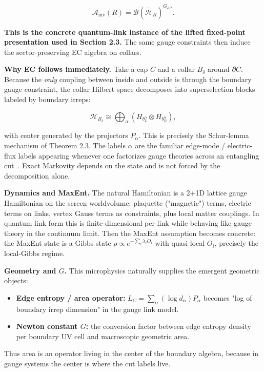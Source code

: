 \[
\mathcal{A}_{\mathrm{inv}}(R) = \mathcal{B}(\tilde{\mathcal{H}}_R)^{G_{\partial R}}.
\]

\textbf{This is the concrete quantum-link instance of the lifted fixed-point presentation used in Section 2.3.} The same gauge constraints then induce the sector-preserving EC algebra on collars.

\textbf{Why EC follows immediately.} Take a cap \(C\) and a collar \(B_\delta\) around \(\partial C\). Because the \emph{only} coupling between inside and outside is through the boundary gauge constraint, the collar Hilbert space decomposes into superselection blocks labeled by boundary irreps:

\[
\mathcal{H}_{B_\delta} \cong \bigoplus_\alpha (H_{b_L^\alpha} \otimes H_{b_R^\alpha}),
\]

with center generated by the projectors \(P_\alpha\). This is precisely the Schur-lemma mechanism of Theorem 2.3. The labels \(\alpha\) are the familiar edge-mode / electric-flux labels appearing whenever one factorizes gauge theories across an entangling cut~\cite{donnellyWall15}. Exact Markovity depends on the state and is not forced by the decomposition alone.

\textbf{Dynamics and MaxEnt.} The natural Hamiltonian is a 2+1D lattice gauge Hamiltonian on the screen worldvolume: plaquette ("magnetic") terms, electric terms on links, vertex Gauss terms as constraints, plus local matter couplings. In quantum link form this is finite-dimensional per link while behaving like gauge theory in the continuum limit. Then the MaxEnt assumption becomes concrete: the MaxEnt state is a Gibbs state \(\rho \propto e^{-\sum_i \lambda_i O_i}\) with quasi-local \(O_i\), precisely the local-Gibbs regime.

\textbf{Geometry and \(G\).} This microphysics naturally supplies the emergent geometric objects:

\begin{itemize}
\tightlist
\item
  \textbf{Edge entropy / area operator:} \(L_C = \sum_\alpha (\log d_\alpha) P_\alpha\) becomes "log of boundary irrep dimension" in the gauge link model.
\item
  \textbf{Newton constant \(G\):} the conversion factor between edge entropy density per boundary UV cell and macroscopic geometric area.
\end{itemize}

Thus area is an operator living in the center of the boundary algebra, because in gauge systems the center is where the cut labels live.

